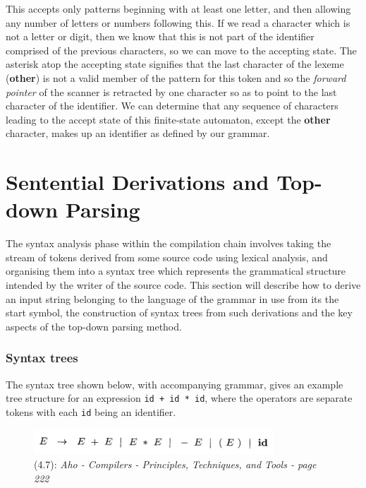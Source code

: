 \documentclass[a4paper, 11pt]{article}
\begin{document}
\noindent This accepts only patterns beginning with at least one letter, and then allowing any number of letters or numbers following this. If we read a character which is not a letter or digit, then we know that this is not part of the identifier comprised of the previous characters, so we can move to the accepting state. The asterisk atop the accepting state signifies that the last character of the lexeme (\textbf{other}) is not a valid member of the pattern for this token and so the \textit{forward pointer} of the scanner is retracted by one character so as to point to the last character of the identifier. We can determine that any sequence of characters leading to the accept state of this finite-state automaton, except the \textbf{other} character, makes up an identifier as defined by our grammar.


\clearpage
\newpage\section{Sentential Derivations and Top-down Parsing}
The syntax analysis phase within the compilation chain involves taking the stream of tokens derived from some source code using lexical analysis, and organising them into a syntax tree which represents the grammatical structure intended by the writer of the source code. This section will describe how to derive an input string belonging to the language of the grammar in use from its the start symbol, the construction of syntax trees from such derivations and the key aspects of the top-down parsing method.

\subsubsection{Syntax trees}
The syntax tree shown below, with accompanying grammar, gives an example tree structure for an expression \texttt{id + id * id}, where the operators are separate tokens with each \texttt{id} being an identifier.

\begin{figure}[ht!]
	\centering
	\includegraphics[width=90mm]{resource/GrammarExample.png}
	{\caption*{(4.7): \textit{Aho - Compilers - Principles, Techniques, and Tools - page 222}} \label{overflow}}
\end{figure}
\end{document}

